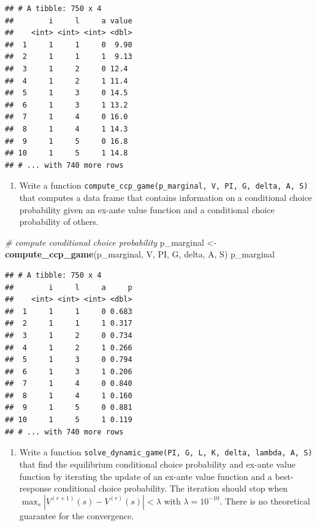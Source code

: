 \documentclass[]{book}
\newenvironment{Shaded}{\begin{snugshade}}{\end{snugshade}}
\newcommand{\KeywordTok}[1]{\textcolor[rgb]{0.13,0.29,0.53}{\textbf{#1}}}
\newcommand{\StringTok}[1]{\textcolor[rgb]{0.31,0.60,0.02}{#1}}
\newcommand{\CommentTok}[1]{\textcolor[rgb]{0.56,0.35,0.01}{\textit{#1}}}
\newcommand{\NormalTok}[1]{#1}
\providecommand{\tightlist}{%
  \setlength{\itemsep}{0pt}\setlength{\parskip}{0pt}}
\begin{document}
\begin{verbatim}
## # A tibble: 750 x 4
##        i     l     a value
##    <int> <int> <int> <dbl>
##  1     1     1     0  9.90
##  2     1     1     1  9.13
##  3     1     2     0 12.4 
##  4     1     2     1 11.4 
##  5     1     3     0 14.5 
##  6     1     3     1 13.2 
##  7     1     4     0 16.0 
##  8     1     4     1 14.3 
##  9     1     5     0 16.8 
## 10     1     5     1 14.8 
## # ... with 740 more rows
\end{verbatim}

\begin{enumerate}
\def\labelenumi{\arabic{enumi}.}
\setcounter{enumi}{9}
\tightlist
\item
  Write a function
  \texttt{compute\_ccp\_game(p\_marginal,\ V,\ PI,\ G,\ delta,\ A,\ S)}
  that computes a data frame that contains information on a conditional
  choice probability given an ex-ante value function and a conditional
  choice probability of others.
\end{enumerate}

\begin{Shaded}
\begin{Highlighting}[]
\CommentTok{# compute conditional choice probability }
\NormalTok{p_marginal <-}\StringTok{ }\KeywordTok{compute_ccp_game}\NormalTok{(p_marginal, V, PI, G, delta, A, S)}
\NormalTok{p_marginal}
\end{Highlighting}
\end{Shaded}

\begin{verbatim}
## # A tibble: 750 x 4
##        i     l     a     p
##    <int> <int> <int> <dbl>
##  1     1     1     0 0.683
##  2     1     1     1 0.317
##  3     1     2     0 0.734
##  4     1     2     1 0.266
##  5     1     3     0 0.794
##  6     1     3     1 0.206
##  7     1     4     0 0.840
##  8     1     4     1 0.160
##  9     1     5     0 0.881
## 10     1     5     1 0.119
## # ... with 740 more rows
\end{verbatim}

\begin{enumerate}
\def\labelenumi{\arabic{enumi}.}
\setcounter{enumi}{10}
\tightlist
\item
  Write a function
  \texttt{solve\_dynamic\_game(PI,\ G,\ L,\ K,\ delta,\ lambda,\ A,\ S)}
  that find the equilibrium conditional choice probability and ex-ante
  value function by iterating the update of an ex-ante value function
  and a best-response conditional choice probability. The iteration
  should stop when \(\max_s|V^{(r + 1)}(s) - V^{(r)}(s)| < \lambda\)
  with \(\lambda = 10^{-10}\). There is no theoretical guarantee for the
  convergence.
\end{enumerate}
\end{document}
